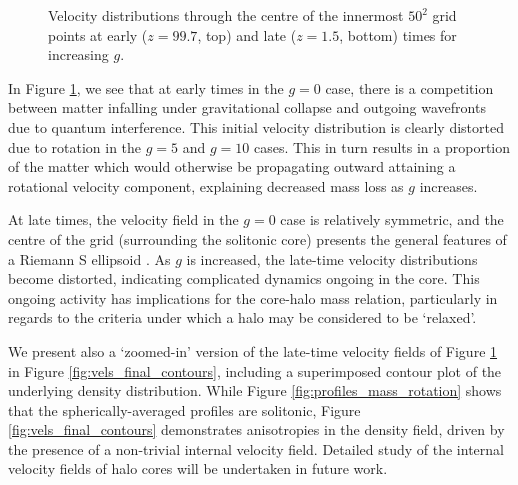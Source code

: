 \documentclass[a4paper,11pt]{article}
\begin{document}
\begin{figure}[!htb]
\endminipage\hfill
\caption{Velocity distributions through the centre of the innermost $50^2$ grid points at early ($z = 99.7$, top) and late ($z = 1.5$, bottom) times for increasing $g$.}
\label{fig:vels_initial_final}
\end{figure}

In Figure \ref{fig:vels_initial_final}, we see that at early times in the $g=0$ case, there is a competition between matter infalling under gravitational collapse and outgoing wavefronts due to quantum interference. This initial velocity distribution is clearly distorted due to rotation in the $g=5$ and $g=10$ cases. This in turn results in a proportion of the matter which would otherwise be propagating outward attaining a rotational velocity component, explaining decreased mass loss as $g$ increases. 

At late times, the velocity field in the $g=0$ case is relatively symmetric, and the centre of the grid (surrounding the solitonic core) presents the general features of a Riemann S ellipsoid \cite{Chandrasekhar1965}. As $g$ is increased, the late-time velocity distributions become distorted, indicating complicated dynamics ongoing in the core. This ongoing activity has implications for the core-halo mass relation, particularly in regards to the criteria under which a halo may be considered to be `relaxed'.

We present also a `zoomed-in' version of the late-time velocity fields of Figure \ref{fig:vels_initial_final} in Figure \ref{fig:vels_final_contours}, including a superimposed contour plot of the underlying density distribution. While Figure \ref{fig:profiles_mass_rotation} shows that the spherically-averaged profiles are solitonic, Figure \ref{fig:vels_final_contours} demonstrates anisotropies in the density field, driven by the presence of a non-trivial internal velocity field. Detailed study of the internal velocity fields of halo cores will be undertaken in future work.
\end{document}

